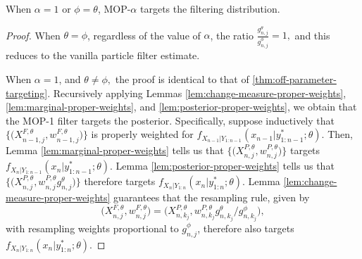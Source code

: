 \begin{prop}
    When $\alpha=1$ or $\phi=\theta$, MOP-$\alpha$ targets the filtering distribution. 
\end{prop}
\begin{proof}
    When $\theta=\phi$, regardless of the value of $\alpha$, the ratio $\frac{g_{n,j}^\theta}{g_{n,j}^\phi}=1,$ and this reduces to the vanilla particle filter estimate.

    When $\alpha=1$, and $\theta\neq\phi,$ the proof is identical to that of \ref{thm:off-parameter-targeting}. Recursively applying Lemmas \ref{lem:change-measure-proper-weights}, \ref{lem:marginal-proper-weights}, and \ref{lem:posterior-proper-weights}, we obtain that 
    the MOP-1 filter targets the posterior.
    Specifically, suppose inductively that $\big\{\big(X^{F,\theta}_{n-1,j},w^{F,\theta}_{n-1,j}\big)\big\}$ is properly weighted for $f_{X_{n-1}|Y_{1:n-1}}(x_{n-1}|y^*_{1:n-1};\theta)$.
    Then, Lemma \ref{lem:marginal-proper-weights} tells us that $\big\{\big(X^{P,\theta}_{n,j},w^{P,\theta}_{n,j}\big)\big\}$ targets $f_{X_{n}|Y_{1:n-1}}(x_{n}|y^*_{1:n-1};\theta)$.
    Lemma \ref{lem:posterior-proper-weights} tells us that $\big\{\big(X^{P,\theta}_{n,j},w^{P,\theta}_{n,j} g^\theta_{n,j} \big)\big\}$ therefore targets  $f_{X_{n}|Y_{1:n}}(x_{n}|y^*_{1:n};\theta)$.
    Lemma \ref{lem:change-measure-proper-weights} guarantees that the resampling rule, given by 
    \[
    \big(X^{F,\theta}_{n,j},w^{F,\theta}_{n,j}\big) = \big(X^{P,\theta}_{n,k_j}, w^{P,\theta}_{n,k_j} g^\theta_{n,k_j}\big/ g^\phi_{n,k_j}\big),
    \]
    with resampling weights proportional to $g^\phi_{n,j}$, therefore also targets $f_{X_{n}|Y_{1:n}}(x_{n}|y^*_{1:n};\theta)$.
\end{proof}


